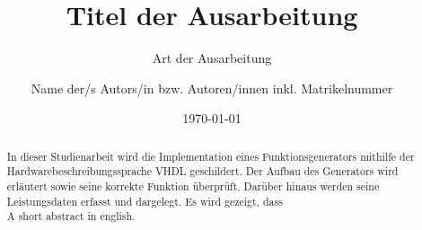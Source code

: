 \documentclass[BCOR=1cm, twoside, ngerman]{scrreprt}
\title{Titel der Ausarbeitung}
\subtitle{Art der Ausarbeitung}
\author{Name der/s Autors/in bzw. Autoren/innen inkl. Matrikelnummer}
\date{\today} %
\begin{document}
\maketitle

\begin{abstract}
  In dieser Studienarbeit wird die Implementation eines Funktionsgenerators mithilfe der Hardwarebeschreibungssprache VHDL geschildert.
  Der Aufbau des Generators wird erläutert sowie seine korrekte Funktion überprüft.
  Darüber hinaus werden seine Leistungsdaten erfasst und dargelegt.
  Es wird gezeigt, dass \\

A short abstract in english.
\end{abstract}

\tableofcontents
\printbibliography[heading=bibintoc, title={Literaturverzeichnis}]




% 
% 
\end{document}
